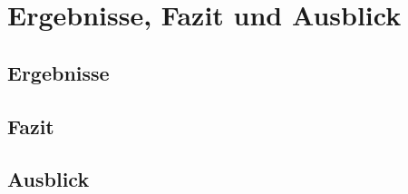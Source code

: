 \chapter{Ergebnisse, Fazit und Ausblick}

\section{Ergebnisse}

\section{Fazit}

\section{Ausblick}
